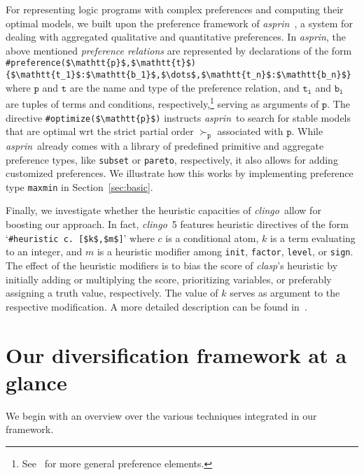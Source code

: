 \documentclass[a4paper,UKenglish]{oasics}
\newcommand{\sysfont}{\textit}
\newcommand{\asprin}{\sysfont{asprin}}
\newcommand{\clasp}{\sysfont{clasp}}
\newcommand{\clingo}{\sysfont{clingo}}
\begin{document}
For representing logic programs with complex preferences and computing their optimal models,
we built upon the preference framework of \asprin~\cite{brderosc15a},
a system for dealing with aggregated qualitative and quantitative preferences.
%
In \asprin, the above mentioned \emph{preference relations} are represented by declarations of the form
\lstinline[mathescape]!#preference($\mathtt{p}$,$\mathtt{t}$){$\mathtt{t_1}$:$\mathtt{b_1}$,$\dots$,$\mathtt{t_n}$:$\mathtt{b_n}$}!
where $\mathtt{p}$ and $\mathtt{t}$ are the name and type of the preference relation, %
and $\mathtt{t_i}$ and $\mathtt{b_i}$ are tuples of terms and conditions, respectively,\footnote{
See~\cite{brderosc15a} %
for more general preference elements.}
%
serving as arguments of $\mathtt{p}$.
%
The directive \lstinline[mathescape]!#optimize($\mathtt{p}$)! instructs \asprin\ to search for stable models that are optimal wrt the strict partial order
$\succ_{\mathtt{p}}$ associated with $\mathtt{p}$.
%
While \asprin\ already comes with a library of predefined primitive and aggregate preference types, like \texttt{subset} or \texttt{pareto},
respectively,
it also allows for adding customized preferences.
%
We illustrate how this works by implementing preference type \texttt{maxmin} in Section~\ref{sec:basic}.
%
%
%
%
%
%
%
%
%
%
%

Finally,
we investigate whether the heuristic capacities of \clingo\ allow for boosting our approach.
%
In fact, \clingo~5 features heuristic directives of the form
`\lstinline[mathescape]!#heuristic c. [$k$,$m$]!'
where $c$ is a conditional atom,
$k$ is a term evaluating to an integer, and 
$m$ is a heuristic modifier among
\lstinline{init}, \lstinline{factor}, \lstinline{level},  or \lstinline{sign}. %
%
The effect of the heuristic modifiers is to bias the score of \clasp's heuristic by
initially adding or multiplying the score,
prioritizing variables, or
preferably assigning a truth value, respectively.
%
The value of $k$ serves as argument to the respective modification.
%
%
%
A more detailed description can be found in~\cite{gekaotroscwa13a}.

%
%
%
%

%
\makeatletter{}%

\section{Our diversification framework at a glance}\label{sec:overview}

We begin with an overview over the various techniques integrated in our framework.
\end{document}
